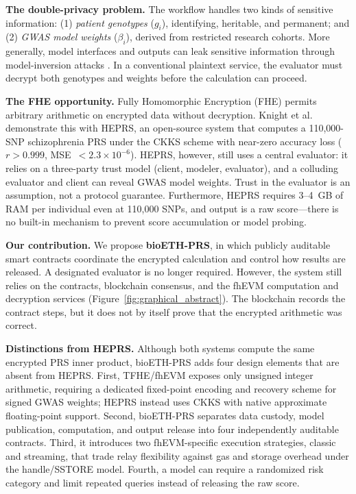 \documentclass[10pt]{article}
\begin{document}
\textbf{The double-privacy problem.}
The workflow handles two kinds of sensitive information: (1)
\emph{patient genotypes} ($g_i$), identifying, heritable, and permanent; and
(2) \emph{GWAS model weights} ($\beta_i$), derived from restricted research cohorts.
More generally, model interfaces and outputs can leak sensitive information through
model-inversion attacks \citep{fredrikson2015modelinversion}.
In a conventional plaintext service, the evaluator must decrypt both genotypes and
weights before the calculation can proceed.

\textbf{The FHE opportunity.}
Fully Homomorphic Encryption (FHE) permits arbitrary arithmetic on encrypted data
without decryption.  Knight et al.\ \citep{knight2026heprs} demonstrate this with
HEPRS, an open-source system that computes a 110,000-SNP schizophrenia PRS under
the CKKS scheme \citep{cheon2017ckks} with near-zero accuracy loss ($r > 0.999$,
MSE~$< 2.3 \times 10^{-6}$).  HEPRS, however, still uses a central evaluator:
it relies on a three-party trust model (client, modeler, evaluator), and a colluding
evaluator and client can reveal GWAS model weights.  Trust in the evaluator is an
assumption, not a protocol guarantee.  Furthermore, HEPRS requires 3--4~GB of RAM
per individual even at 110,000 SNPs, and output is a raw score---there is no built-in
mechanism to prevent score accumulation or model probing.

\textbf{Our contribution.}
We propose \textbf{bioETH-PRS}, in which publicly auditable smart contracts coordinate
the encrypted calculation and control how results are released.  A designated
evaluator is no longer required.  However, the system still relies
on the contracts, blockchain consensus, and the fhEVM computation and decryption
services (Figure~\ref{fig:graphical_abstract}).  The blockchain records the contract
steps, but it does not by itself prove that the encrypted arithmetic was correct.

\smallskip\noindent\textbf{Distinctions from HEPRS.}
Although both systems compute the same encrypted PRS inner product, bioETH-PRS adds
four design elements that are absent from HEPRS.  First, TFHE/fhEVM exposes only
unsigned integer arithmetic, requiring a dedicated fixed-point encoding and recovery
scheme for signed GWAS weights; HEPRS instead uses CKKS with native approximate
floating-point support.  Second, bioETH-PRS separates data custody, model publication,
computation, and output release into four independently auditable contracts.  Third, it
introduces two fhEVM-specific execution strategies, classic and streaming, that trade
relay flexibility against gas and storage overhead under the handle/SSTORE model.
Fourth, a model can require a randomized risk category and limit repeated queries
instead of releasing the raw score.
\end{document}
